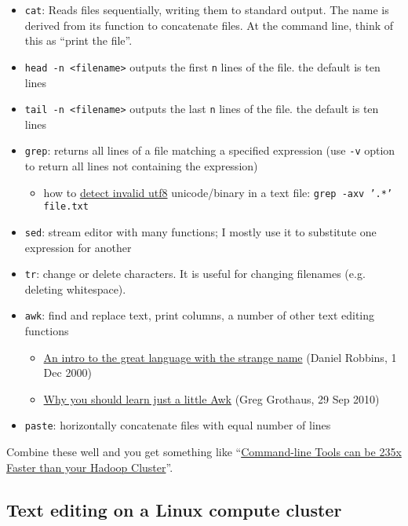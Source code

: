 \begin{itemize}
	\item \texttt{cat}: Reads files sequentially, writing them to standard output. The name is derived from its function to concatenate files. At the command line, think of this as ``print the file''.
	\item \texttt{head -n <filename>} outputs the first \texttt{n} lines of the file. the default is ten lines
	\item \texttt{tail -n <filename>} outputs the last \texttt{n} lines of the file. the default is ten lines
	\item \texttt{grep}: returns all lines of a file matching a specified expression (use \texttt{-v} option to return all lines not containing the expression)
	\begin{itemize}
		\item how to \href{https://stackoverflow.com/questions/29465612/how-to-detect-invalid-utf8-unicode-binary-in-a-text-file}{detect invalid utf8} unicode/binary in a text file: \texttt{grep -axv '.*' file.txt}
	\end{itemize}
	\item \texttt{sed}: stream editor with many functions; I mostly use it to substitute one expression for another
	\item \texttt{tr}: change or delete characters. It is useful for changing filenames (e.g. deleting whitespace).
	\item \texttt{awk}: find and replace text, print columns, a number of other text editing functions
	\begin{itemize}
		\item \href{https://developer.ibm.com/tutorials/l-awk1/}{An intro to the great language with the strange name} (Daniel Robbins, 1 Dec 2000)
		\item \href{https://gregable.com/2010/09/why-you-should-know-just-little-awk.html}{Why you should learn just a little Awk} (Greg Grothaus, 29 Sep 2010)
	\end{itemize}
	\item \texttt{paste}: horizontally concatenate files with equal number of lines
\end{itemize}

Combine these well and you get something like
``\href{https://adamdrake.com/command-line-tools-can-be-235x-faster-than-your-hadoop-cluster.html}{Command-line Tools can be 235x Faster than your Hadoop Cluster}''.

\subsection{Text editing on a Linux compute cluster}

